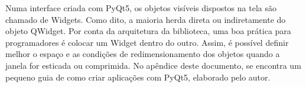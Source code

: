 Numa interface criada com PyQt5, os objetos visíveis dispostos na tela são chamado de Widgets. Como dito, a maioria herda direta ou indiretamente do objeto QWidget. Por conta da arquitetura da biblioteca, uma boa prática para programadores é colocar um Widget dentro do outro. Assim, é possível definir melhor o espaço e as condições de redimensionamento dos objetos quando a janela for esticada ou comprimida.
No apêndice deste documento, se encontra um pequeno guia de como criar aplicações com PyQt5, elaborado pelo autor.
